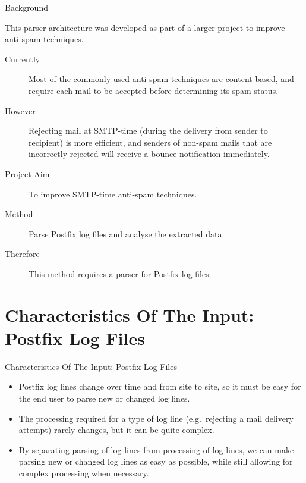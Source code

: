 \documentclass{beamer}
\newcommand{\timingnote}[1]{%
}
\begin{document}
\begin{frame}{Background}

    \timingnote{1--2 minutes}

    This parser architecture was developed as part of a larger project to
    improve anti-spam techniques.

    \begin{description}

        \item [Currently] Most of the commonly used anti-spam techniques
            are content-based, and require each mail to be accepted before
            determining its spam status.

        \item [However] Rejecting mail at SMTP-time (during the delivery
            from sender to recipient) is more efficient, and senders of
            non-spam mails that are incorrectly rejected will receive a
            bounce notification immediately.

        \item [Project Aim] To improve SMTP-time anti-spam techniques.

        \item [Method] Parse Postfix log files and analyse the
            extracted data.  \timingnote{Explain where log lines come from}

        \item [Therefore] This method requires a parser for Postfix log
            files.

    \end{description}

\end{frame}

\section{Characteristics Of The Input: Postfix Log Files}

\begin{frame}{Characteristics Of The Input: Postfix Log Files}

    \timingnote{1 minute}

    \begin{itemize}

        \item Postfix log lines change over time and from site to site, so
            it must be easy for the end user to parse new or changed log
            lines.

        \item The processing required for a type of log line (e.g.\
            rejecting a mail delivery attempt) rarely changes, but it can
            be quite complex.

        \item By separating parsing of log lines from processing of log
            lines, we can make parsing new or changed log lines as easy as
            possible, while still allowing for complex processing when
            necessary.

    \end{itemize}

\end{frame}
\end{document}
